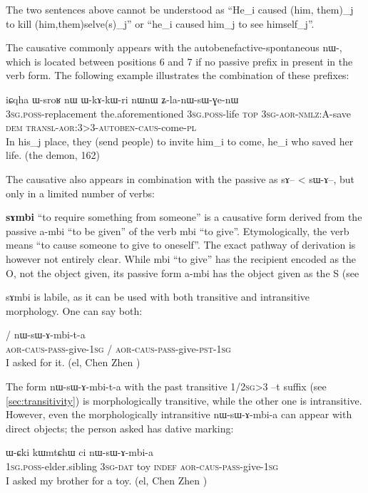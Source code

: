 \documentclass[oldfontcommands,oneside,a4paper,11pt]{memoir}
\newcommand{\ipa}[1]{{\phon #1}} %
\newcommand{\wav}[1]{}%
\newcommand{\aor}{\textsc{aor}}
\newcommand{\auto}{\textsc{autoben}}
\newcommand{\caus}{\textsc{caus}}
\newcommand{\dat}{\textsc{dat}}
\newcommand{\dem}{\textsc{dem}}
\newcommand{\indef}{\textsc{indef}}
\newcommand{\nmlz}{\textsc{nmlz}}
\newcommand{\pl}{\textsc{pl}}
\newcommand{\pass}{\textsc{pass}}
\newcommand{\poss}{\textsc{poss}}
\newcommand{\pst}{\textsc{pst}}
\newcommand{\sg}{\textsc{sg}}
\newcommand{\topic}{\textsc{top}}
\newcommand{\transloc}{\textsc{transl}}
\begin{document}
The two sentences above cannot be understood as  ``He_i caused (him, them)_j to kill (him,them)selve(s)_j'' or ``he_i caused him_j to see himself_j''.


The causative commonly appears with the autobenefactive-spontaneous \ipa{nɯ-}, which is located between positions 6 and 7 if no passive prefix in present in the verb form. The following example illustrates the combination of these prefixes:


 \begin{exe}
\ex 
\gll \ipa{ɯ-sci} 	\ipa{iɕqha} 	\ipa{ɯ-sroʁ} 	\ipa{nɯ} 	\ipa{ɯ-kɤ-kɯ-ri} 	\ipa{nɯnɯ} \ipa{ʑ-la-nɯ-sɯ-ɣe-nɯ} \\
3\sg{}.\poss{}-replacement the.aforementioned 3\sg{}.\poss{}-life \topic{} 3\sg{}-\aor{}-\nmlz{}:A-save \dem{} \transloc{}-\aor{}:3>3-\auto{}-\caus{}-come-\pl{} \\
\glt In his_j place, they (send people) to invite him_i to come, he_i who saved her life.    (the demon, 162)
\end{exe}

 The causative also appears in combination with the passive as \ipa{sɤ}-- < \ipa{sɯ-ɤ}--, but only in a limited number of verbs:
 
 
  \textbf{\ipa{sɤmbi}} ``to require something from someone'' is a causative form derived from the passive \ipa{a-mbi} ``to be given'' of the verb \ipa{mbi} ``to give''. Etymologically, the verb means ``to cause someone to give to oneself''. The exact pathway of derivation is however not entirely clear. While \ipa{mbi} ``to give'' has the recipient encoded as the O, not the object given, its passive form \ipa{a-mbi} has the object given as the S (see \Ref
  
  \ipa{sɤmbi} is labile, as it can be used with both transitive and intransitive morphology. One can say both:
   \begin{exe}
\ex
\gll   \ipa{nɯ-sɯ-ɤ-mbi-a}  / \ipa{nɯ-sɯ-ɤ-mbi-t-a}\\
\aor{}-\caus{}-\pass{}-give-1\sg{} /  \aor{}-\caus{}-\pass{}-give-\pst{}-1\sg{} \\
 \glt I asked for it. (el, Chen Zhen \wav{8_sAmbi})
\end{exe}   
  The form \ipa{nɯ-sɯ-ɤ-mbi-t-a} with the past transitive 1/2\sg{}>3 --\ipa{t} suffix (see \ref{sec:transitivity}) is morphologically transitive, while the other one is intransitive. However, even the morphologically intransitive \ipa{nɯ-sɯ-ɤ-mbi-a} can appear with direct objects; the person asked has dative marking:
    \begin{exe}
\ex
\gll \ipa{a-pi} 	\ipa{ɯ-ɕki} 	\ipa{kɯmtɕhɯ} 	\ipa{ci}   \ipa{nɯ-sɯ-ɤ-mbi-a}    \\
1\sg{}.\poss{}-elder.sibling 3\sg{}-\dat{} toy \indef{} \aor{}-\caus{}-\pass{}-give-1\sg{}   \\
 \glt I asked my brother for a toy. (el, Chen Zhen \wav{8_sAmbi})
\end{exe}   
  
\end{document}
